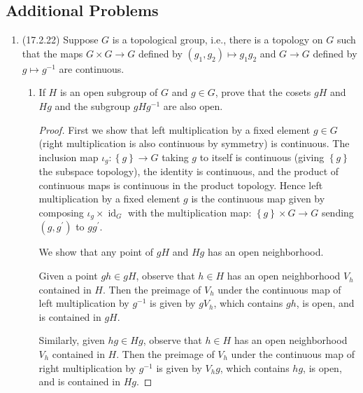 \documentclass[11pt]{article}
\newcommand{\cbr}[1]{\left\{#1\right\}}
\DeclareMathOperator{\id}{id}
\begin{document}
\subsection*{Additional Problems}
\begin{enumerate}
    \item (17.2.22) %
    Suppose $G$ is a topological group, i.e., there is a topology on $G$ such that the maps $G\times G\to G$ defined by $(g_1,g_2)\mapsto g_1g_2$ and $G\to G$ defined by $g\mapsto g^{-1}$ are continuous. \begin{enumerate}
        \item If $H$ is an open subgroup of $G$ and $g\in G$, prove that the cosets $gH$ and $Hg$ and the subgroup $gHg^{-1}$ are also open. \begin{proof}
            First we show that left multiplication by a fixed element $g\in G$ (right multiplication is also continuous by symmetry) is continuous. The inclusion map $\iota_g\colon \cbr{g}\to G$ taking $g$ to itself is continuous (giving $\cbr{g}$ the subspace topology), the identity is continuous, and the product of continuous maps is continuous in the product topology. Hence left multiplication by a fixed element $g$ is the continuous map given by composing $\iota_g\times \id_G$ with the multiplication map: $\cbr{g}\times G\to G$ sending $(g,g^\prime)$ to $gg^\prime$.
            
            We show that any point of $gH$ and $Hg$ has an open neighborhood. 

            Given a point $gh\in gH$, observe that $h\in H$ has an open neighborhood $V_h$ contained in $H$. Then the preimage of $V_h$ under the continuous map of left multiplication by $g^{-1}$ is given by $gV_h$, which contains $gh$, is open, and is contained in $gH$. 
            
            Similarly, given $hg \in Hg$, observe that $h\in H$ has an open neighborhood $V_h$ contained in $H$. Then the preimage of $V_h$ under the continuous map of right multiplication by $g^{-1}$ is given by $V_hg$, which contains $hg$, is open, and is contained in $Hg$. 


\end{proof}
\end{enumerate}
\end{enumerate}
\end{document}
